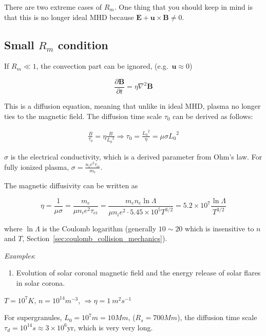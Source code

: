 \documentclass[
  notoc %
]{tufte-book}
\providecommand{\tightlist}{%
  \setlength{\itemsep}{0pt}\setlength{\parskip}{0pt}
}
\begin{document}
There are two extreme cases of \(R_m\). One thing that you should keep
in mind is that this is no longer ideal MHD because
\(\mathbf{E}+\mathbf{u}\times\mathbf{B}\neq0\).

\hypertarget{small-r_m-condition}{%
\subsection{\texorpdfstring{Small \(R_m\)
condition}{Small R\_m condition}}\label{small-r_m-condition}}

If \(R_m\ll1\), the convection part can be ignored,
(e.g.~\(\mathbf{u}\approx 0\))

\[
\frac{\partial\mathbf{B}}{\partial t}=\eta\nabla^2\mathbf{B}
\]

This is a diffusion equation, meaning that unlike in ideal MHD, plasma
no longer ties to the magnetic field. The diffusion time scale
\(\tau_0\) can be derived as follows:

\[
\begin{aligned}
\frac{B}{\tau_0}=\eta\frac{B}{{L_0}^2}\Rightarrow \tau_0=\frac{{L_0}^2}{\eta}=\mu\sigma {L_0}^2
\end{aligned}
\]

\(\sigma\) is the electrical conductivity, which is a derived parameter
from Ohm's law. For fully ionized plasma,
\(\sigma=\frac{n_i e^2 \tau_{ei}}{m_e}\).

The magnetic diffusivity can be written as

\[
\eta=\frac{1}{\mu\sigma}=\frac{m_e}{\mu n_i e^2\tau_{ei}}=\frac{m_e n_e \ln\Lambda}{\mu n_i e^2 \cdot 5.45\times10^{5}T^{3/2}} =5.2\times10^7 \frac{\ln\Lambda}{T^{3/2}}
\]

where \(\ln\Lambda\) is the Coulomb logarithm (generally \(10\sim20\)
which is insensitive to \(n\) and \(T\),
Section~\ref{sec:coulomb_collision_mechanics}).

\emph{Examples}:

\begin{enumerate}
\def\labelenumi{\arabic{enumi}.}
\tightlist
\item
  Evolution of solar coronal magnetic field and the energy release of
  solar flares in solar corona.
\end{enumerate}

\(T=10^{7}K\), \(n=10^{14}m^{-3}\), \(\Rightarrow \eta=1\ m^2s^{-1}\)

For supergranules, \(L_0=10^7m=10Mm\), (\(R_s=700Mm\)), the diffusion
time scale \(\tau_d=10^{14}s\approx3\times10^6\text{yr}\), which is very
very long.
\end{document}
